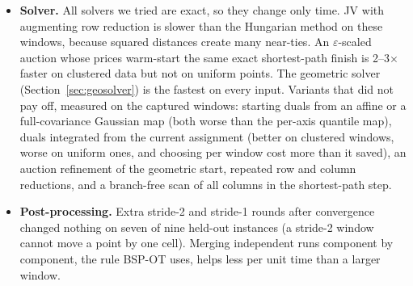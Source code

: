 \begin{itemize}
  cannot repair. The random start is a decorrelating device, not a lazy default.
\item \textbf{Solver.} All solvers we tried are exact, so they change only time. JV with
  augmenting row reduction is slower than the Hungarian method on these windows,
  because squared distances create many near-ties. An $\varepsilon$-scaled auction whose
  prices warm-start the same exact shortest-path finish is 2--3$\times$ faster on clustered
  data but not on uniform points. The geometric solver (Section~\ref{sec:geosolver}) is the
  fastest on every input. Variants that did not pay off, measured on the captured
  windows: starting duals from an affine or a full-covariance Gaussian map (both worse than
  the per-axis quantile map), duals integrated from the current assignment (better on
  clustered windows, worse on uniform ones, and choosing per window cost more than it
  saved), an auction refinement of the geometric start, repeated row and column
  reductions, and a branch-free scan of all columns in the shortest-path step.
\item \textbf{Post-processing.} Extra stride-2 and stride-1 rounds after convergence changed
  nothing on seven of nine held-out instances (a stride-2 window cannot move a point by one
  cell).
  Merging independent runs component by component, the rule BSP-OT uses, helps less per
  unit time than a larger window.
\end{itemize}
